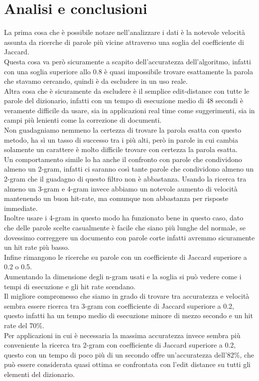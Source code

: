 \documentclass[]{article}
\begin{document}
\section{Analisi e conclusioni}
La prima cosa che è possibile notare nell'analizzare i dati è la notevole velocità assunta da ricerche di parole più vicine attraverso una soglia del coefficiente di Jaccard.\\
Questa cosa va però sicuramente a scapito dell'accuratezza dell'algoritmo, infatti con una soglia superiore allo 0.8 è quasi impossibile trovare esattamente la parola che stavamo cercando, quindi è da escludere in un uso reale.\\
Altra cosa che è sicuramente da escludere è il semplice edit-distance con tutte le parole del dizionario, infatti con un tempo di esecuzione medio di 48 secondi è veramente difficile da usare, sia in applicazioni real time come suggerimenti, sia in campi più lenienti come la correzione di documenti.\\
Non guadagniamo nemmeno la certezza di trovare la parola esatta con questo metodo, ha sì un tasso di successo tra i più alti, però in parole in cui cambia solamente un carattere è molto difficile trovare con certezza la parola esatta.\\
Un comportamento simile lo ha anche il confronto con parole che condividono almeno un 2-gram, infatti ci saranno così tante parole che condividono almeno un 2-gram che il guadagno di questo filtro non è abbastanza.
Usando la ricerca tra almeno un 3-gram e 4-gram invece abbiamo un notevole aumento di velocità mantenendo un buon hit-rate, ma comunque non abbastanza per risposte immediate.\\
Inoltre usare i 4-gram in questo modo ha funzionato bene in questo caso, dato che delle parole scelte casualmente è facile che siano più lunghe del normale, se dovessimo correggere un documento con parole corte infatti avremmo sicuramente un hit rate più basso.\\
Infine rimangono le ricerche su parole con un coefficiente di Jaccard superiore a 0.2 o 0.5.\\
Aumentando la dimensione degli n-gram usati e la soglia si può vedere come i tempi di esecuzione e gli hit rate scendano.\\
Il migliore compromesso che siamo in grado di trovare tra accuratezza e velocità sembra essere ricerca tra 3-gram con coefficiente di Jaccard superiore a 0.2, questo infatti ha un tempo medio di esecuzione minore di mezzo secondo e un hit rate del 70\%.\\
Per applicazioni in cui è necessaria la massima accuratezza invece sembra più conveniente la ricerca tra 2-gram con coefficiente di Jaccard superiore a 0.2, questo con un tempo di poco più di un secondo offre un'accuratezza dell'82\%, che può essere considerata quasi ottima se confrontata con l'edit distance su tutti gli elementi del dizionario.\\ 
\end{document}
